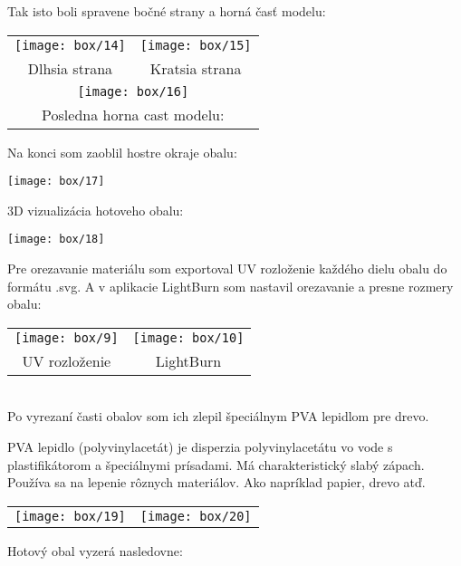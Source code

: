         \vspace{1cm}

        Tak isto boli spravene bočné strany a horná časť modelu: \\

        \begin{tabular}{c c}
          \texttt{[image: box/14]} & \texttt{[image: box/15]} \\
          Dlhsia strana & Kratsia strana \\ \multicolumn{2}{c}{\texttt{[image: box/16]}} \\
          \multicolumn{2}{c}{Posledna horna cast modelu:}
        \end{tabular}

        \newpage
        Na konci som zaoblil hostre okraje obalu:

        \begin{center}
          \texttt{[image: box/17]}
        \end{center}

        3D vizualizácia hotoveho obalu: \\

        \begin{center}
          \texttt{[image: box/18]}
        \end{center}

        Pre orezavanie materiálu som exportoval UV rozloženie každého dielu obalu do formátu .svg. A v aplikacie LightBurn som nastavil orezavanie a presne rozmery obalu:

        \begin{tabular}{c c}
          \texttt{[image: box/9]} & \texttt{[image: box/10]} \\
          UV rozloženie & LightBurn \\
        \end{tabular} \\

        Po vyrezaní časti obalov som ich zlepil špeciálnym PVA lepidlom pre drevo.

        PVA lepidlo (polyvinylacetát) je disperzia polyvinylacetátu vo vode s plastifikátorom a špeciálnymi prísadami. Má charakteristický slabý zápach. Používa sa na lepenie rôznych materiálov. Ako napríklad papier, drevo atď. \\

        \begin{tabular}{c c}
          \texttt{[image: box/19]} & \texttt{[image: box/20]} \\
        \end{tabular}
        Hotový obal vyzerá nasledovne:

